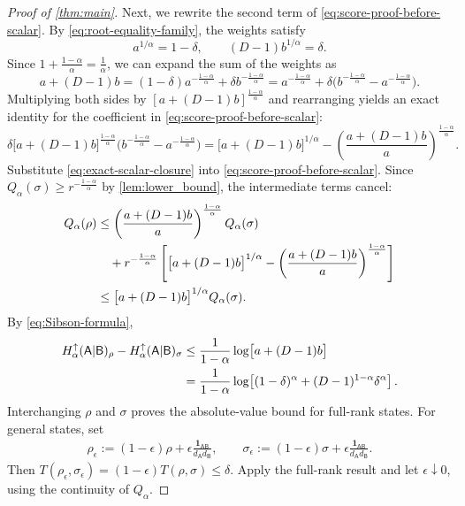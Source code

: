 \documentclass[11pt,reqno]{amsart}
\theoremstyle{definition}
\newcommand{\I}{\mathbf 1}
\newcommand{\A}{\mathsf{A}}
\newcommand{\B}{\mathsf{B}}
\begin{document}
\begin{proof}[Proof of \cref{thm:main}]
Next, we rewrite the second term of \cref{eq:score-proof-before-scalar}.
By \cref{eq:root-equality-family}, the weights satisfy
\begin{equation}\label{eq:root-mass-identities}
 a^{1/\alpha}=1-\delta,
 \qquad
 (D-1)b^{1/\alpha}=\delta.
\end{equation}
Since $1+\frac{1-\alpha}{\alpha}=\frac{1}{\alpha}$, we can expand the sum of the weights as
\begin{equation*}
	a+(D-1)b 
	= (1-\delta)a^{-\frac{1-\alpha}{\alpha}} + \delta b^{-\frac{1-\alpha}{\alpha}} 
	= a^{-\frac{1-\alpha}{\alpha}} + \delta\bigl(b^{-\frac{1-\alpha}{\alpha}} - a^{-\frac{1-\alpha}{\alpha}}\bigr).
\end{equation*}
Multiplying both sides by $[a+(D-1)b]^{\frac{1-\alpha}{\alpha}}$ and rearranging yields an exact identity for the coefficient in \cref{eq:score-proof-before-scalar}:
\begin{equation}\label{eq:exact-scalar-closure}
	\delta\bigl[a+(D-1)b\bigr]^{\frac{1-\alpha}{\alpha}}
	\bigl(b^{-\frac{1-\alpha}{\alpha}}-a^{-\frac{1-\alpha}{\alpha}}\bigr)
	=
	\bigl[a+(D-1)b\bigr]^{1/\alpha}
	-\left(\frac{a+(D-1)b}{a}\right)^{\frac{1-\alpha}{\alpha}}.
\end{equation}
Substitute \cref{eq:exact-scalar-closure} into
\cref{eq:score-proof-before-scalar}.  Since
$Q_\alpha(\sigma)\geq r^{-\frac{1-\alpha}{\alpha}}$ by
\cref{lem:lower_bound}, the intermediate terms cancel:
\begin{align}
 Q_\alpha(\rho)
 &\leq
 \left(\frac{a+(D-1)b}{a}\right)^{\frac{1-\alpha}{\alpha}}Q_\alpha(\sigma)\notag\\
 &\quad+
 r^{-\frac{1-\alpha}{\alpha}}\left[
 \bigl[a+(D-1)b\bigr]^{1/\alpha}
 -\left(\frac{a+(D-1)b}{a}\right)^{\frac{1-\alpha}{\alpha}}
 \right]\notag\\
 &\leq
 \bigl[a+(D-1)b\bigr]^{1/\alpha}Q_\alpha(\sigma).
 \label{eq:Q-ratio-final}
\end{align}
By \cref{eq:Sibson-formula},
\begin{align}
 H_\alpha^\uparrow(\A|\B)_\rho
 -H_\alpha^\uparrow(\A|\B)_\sigma
 &\leq
 \frac{1}{1-\alpha}\log\bigl[a+(D-1)b\bigr]\notag\\
 &=\frac{1}{1-\alpha}
 \log\!\left[(1-\delta)^\alpha
 +(D-1)^{1-\alpha}\delta^\alpha\right].
 \label{eq:one-sided-final}
\end{align}
Interchanging $\rho$ and $\sigma$ proves the absolute-value bound for full-rank
states.
For general states, set
\begin{align}
\rho_\epsilon
:=
(1-\epsilon)\rho
+\epsilon\frac{\I_{\A\B}}{d_{\A}d_{\B}},
\qquad
\sigma_\epsilon
:=
(1-\epsilon)\sigma
+\epsilon\frac{\I_{\A\B}}{d_{\A}d_{\B}}.
\end{align}
Then $T(\rho_\epsilon,\sigma_\epsilon)
=(1-\epsilon)T(\rho,\sigma)
\leq\delta$.
Apply the full-rank result and let $\epsilon\downarrow0$, using the
continuity of $Q_\alpha$.


\end{proof}
\end{document}
